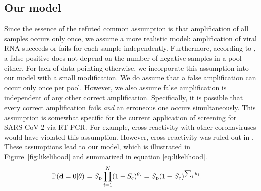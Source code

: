 \documentclass{article}
\begin{document}
\subsection*{Our model}\label{subsec:ours}
Since the essence of the refuted common assumption is that
amplification of all samples occurs only once, we assume a more
realistic model: amplification of viral RNA succeeds or fails for each
sample independently. Furthermore, according to \cite{Simplistic1,
  Simplistic2, Kim, OptimalDorfmanPool}, a false-positive does not
depend on the number of negative samples in a pool either. For lack of
data pointing otherwise, we incorporate this assumption into our model
with a small modification. We do assume that a false amplification can
occur only once per pool. However, we also assume false amplification
is independent of any other correct amplification. Specifically, it is
possible that every correct amplification fails \emph{and} an
erroneous one occurs simultaneously. This assumption is somewhat
specific for the current application of screening for SARS-CoV-2 via
RT-PCR. For example, cross-reactivity with other coronaviruses would
have violated this assumption. However, cross-reactivity was ruled out
in \cite{KitComparison}. These assumptions lead to our model, which is
illustrated in Figure~\ref{fig:likelihood} and summarized in equation
\eqref{eq:likelihood}.
\begin{align}\label{eq:likelihood}
    \mathbb{P}(\mathbf{d}=0 | \theta) &= S_{\text{p}}\prod_{i=1}^N (1-S_{\text{e}})^{\theta_i} =
    S_{\text{p}}(1-S_\text{e})^{\sum_i\theta_i}.
\end{align}
\end{document}
